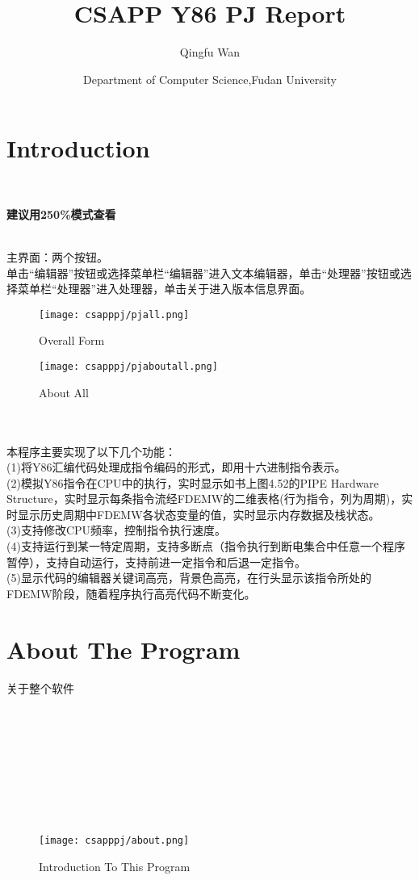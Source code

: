 \documentclass{article}
\title{\textbf{CSAPP Y86 PJ Report}}
\author{Qingfu Wan
\and
Department of Computer Science,Fudan University
}
\begin{document}
\maketitle
\begin{spacing}{1.5}
\section{Introduction}
\noindent
{}
\setlength{\hangindent}{2.5em}\\
\begin{Huge}
\textbf{建议用250\%模式查看}\\\\
\end{Huge}
主界面：两个按钮。\\
单击“编辑器”按钮或选择菜单栏“编辑器”进入文本编辑器，单击“处理器”按钮或选择菜单栏“处理器”进入处理器，单击关于进入版本信息界面。
\begin{figure}[htbp]
\centering
\texttt{[image: csapppj/pjall.png]}
\caption{Overall Form}
\end{figure}
\begin{figure}[htbp]
\centering
\texttt{[image: csapppj/pjaboutall.png]}
\caption{About All}
\end{figure}
\\
\\
本程序主要实现了以下几个功能：\\
(1)将Y86汇编代码处理成指令编码的形式，即用十六进制指令表示。\\
(2)模拟Y86指令在CPU中的执行，实时显示如书上图4.52的PIPE Hardware Structure，实时显示每条指令流经FDEMW的二维表格(行为指令，列为周期)，实时显示历史周期中FDEMW各状态变量的值，实时显示内存数据及栈状态。\\
(3)支持修改CPU频率，控制指令执行速度。\\
(4)支持运行到某一特定周期，支持多断点（指令执行到断电集合中任意一个程序暂停），支持自动运行，支持前进一定指令和后退一定指令。\\
(5)显示代码的编辑器关键词高亮，背景色高亮，在行头显示该指令所处的FDEMW阶段，随着程序执行高亮代码不断变化。\\
\section{About The Program}
关于整个软件\\\\\\\\\\\\\\\\\\
\begin{figure}[htbp]
\centering
\texttt{[image: csapppj/about.png]}
\caption{Introduction To This Program}
\end{figure}


\end{spacing}
\end{document}
